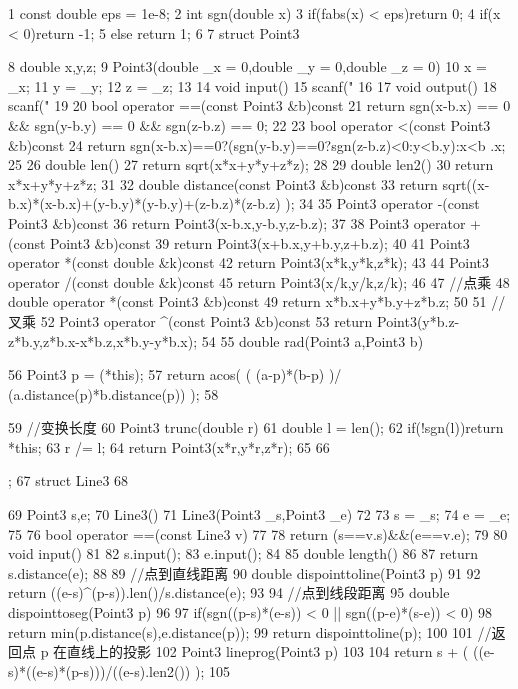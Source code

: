 \documentclass[11pt]{article}
\begin{document}
\begin{Code}
 1    const double eps = 1e-8;
 2    int sgn(double x){
 3        if(fabs(x) < eps)return 0;
 4        if(x < 0)return -1;
 5        else return 1;
 6    }
 7    struct Point3{


 8       double x,y,z;
 9       Point3(double _x = 0,double _y = 0,double _z = 0){
10           x = _x;
11           y = _y;
12           z = _z;
13       }
14       void input(){
15           scanf("%
16       }
17       void output(){
18           scanf("%
19       }
20       bool operator ==(const Point3 &b)const{
21           return sgn(x-b.x) == 0 && sgn(y-b.y) == 0 && sgn(z-b.z) ==
                0;
22       }
23       bool operator <(const Point3 &b)const{
24           return sgn(x-b.x)==0?(sgn(y-b.y)==0?sgn(z-b.z)<0:y<b.y):x<b
                .x;
25       }
26       double len(){
27           return sqrt(x*x+y*y+z*z);
28       }
29       double len2(){
30           return x*x+y*y+z*z;
31       }
32       double distance(const Point3 &b)const{
33           return sqrt((x-b.x)*(x-b.x)+(y-b.y)*(y-b.y)+(z-b.z)*(z-b.z)
                );
34       }
35       Point3 operator -(const Point3 &b)const{
36           return Point3(x-b.x,y-b.y,z-b.z);
37       }
38       Point3 operator +(const Point3 &b)const{
39           return Point3(x+b.x,y+b.y,z+b.z);
40       }
41       Point3 operator *(const double &k)const{
42           return Point3(x*k,y*k,z*k);
43       }
44       Point3 operator /(const double &k)const{
45           return Point3(x/k,y/k,z/k);
46       }
47       //点乘
48       double operator *(const Point3 &b)const{
49           return x*b.x+y*b.y+z*b.z;
50       }
51       //叉乘
52       Point3 operator ^(const Point3 &b)const{
53           return Point3(y*b.z-z*b.y,z*b.x-x*b.z,x*b.y-y*b.x);
54       }
55       double rad(Point3 a,Point3 b){


56              Point3 p = (*this);
57              return acos( ( (a-p)*(b-p) )/ (a.distance(p)*b.distance(p))
                    );
 58     }
 59     //变换长度
 60     Point3 trunc(double r){
 61         double l = len();
 62         if(!sgn(l))return *this;
 63         r /= l;
 64         return Point3(x*r,y*r,z*r);
 65     }
 66 };
 67 struct Line3
 68 {
 69     Point3 s,e;
 70     Line3(){}
 71     Line3(Point3 _s,Point3 _e)
 72     {
 73         s = _s;
 74         e = _e;
 75     }
 76     bool operator ==(const Line3 v)
 77     {
 78         return (s==v.s)&&(e==v.e);
 79     }
 80     void input()
 81     {
 82         s.input();
 83         e.input();
 84     }
 85     double length()
 86     {
 87         return s.distance(e);
 88     }
 89     //点到直线距离
 90     double dispointtoline(Point3 p)
 91     {
 92         return ((e-s)^(p-s)).len()/s.distance(e);
 93     }
 94     //点到线段距离
 95     double dispointtoseg(Point3 p)
 96     {
 97         if(sgn((p-s)*(e-s)) < 0 || sgn((p-e)*(s-e)) < 0)
 98              return min(p.distance(s),e.distance(p));
 99         return dispointtoline(p);
100     }
101     //返回点 p 在直线上的投影
102     Point3 lineprog(Point3 p)
103     {
104         return s + ( ((e-s)*((e-s)*(p-s)))/((e-s).len2()) );
105     }


}
\end{Code}
\end{document}
